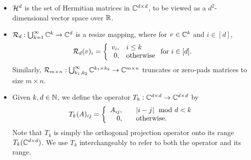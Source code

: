 \begin{itemize}
  \item $\mathcal{H}^d$ is the set of Hermitian matrices in $\mathbb{C}^{d \times d}$, to be viewed as a $d^2$-dimensional vector space over $\mathbb{R}$.
  \item $\mathcal{R}_d : \bigcup_{k = 1}^\infty \mathbb{C}^k \to \mathbb{C}^d$ is a resize mapping, where for $v \in \mathbb{C}^k$ and $i \in [d],$ $$\mathcal{R}_d(v)_i = \left\{\begin{array}{r@{,\quad}l} v_i & i \le k \\ 0 & \text{otherwise} \end{array}\right. \text{for}\ i \in [d].$$  Similarly, $\mathcal{R}_{m \times n} : \bigcup_{k_1, k_2}^\infty \mathbb{C}^{k_1 \times k_2} \to \mathbb{C}^{m \times n}$ truncates or zero-pads matrices to size $m \times n.$
    \item Given $k, d \in \mathbb{N}$, we define the operator $T_k : \mathbb{C}^{d \times d} \to \mathbb{C}^{d \times d}$ by \[T_k(A)_{ij} = \left\{\begin{array}{r@{,\qquad}l} A_{ij} & |i - j| \mod d < k \\ 0 & \text{otherwise}. \end{array}\right.\]  Note that $T_k$ is simply the orthogonal projection operator onto its range $T_k(\mathbb{C}^{d \times d})$.  We use $T_k$ interchangeably to refer to both the operator and its range.
\end{itemize}
